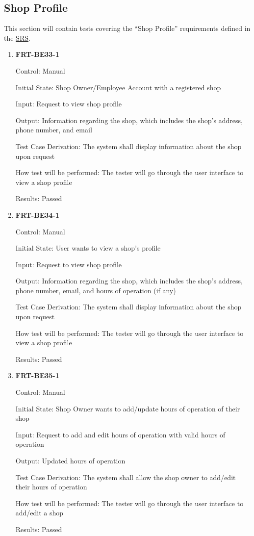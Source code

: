 \documentclass[12pt, titlepage]{article}
\begin{document}
\subsection{Shop Profile}
This section will contain tests covering the ``Shop Profile'' requirements defined in the
\href{https://github.com/arkinmodi/project-sayyara/blob/main/docs/SRS/SRS.pdf}{SRS}.

\begin{enumerate}
	\item \textbf{FRT-BE33-1}

	      Control: Manual

	      Initial State: Shop Owner/Employee Account with a registered shop

	      Input: Request to view shop profile

	      Output: Information regarding the shop, which includes the shop's address, phone number, and email

	      Test Case Derivation: The system shall display information about the shop upon request

	      How test will be performed: The tester will go through the user interface to view a shop profile

	      Results: Passed

	\item \textbf{FRT-BE34-1}

	      Control: Manual

	      Initial State: User wants to view a shop's profile

	      Input: Request to view shop profile

	      Output: Information regarding the shop, which includes the shop's address, phone number, email, and
	      hours of operation (if any)

	      Test Case Derivation: The system shall display information about the shop upon request

	      How test will be performed: The tester will go through the user interface to view a shop profile

	      Results: Passed

	\item \textbf{FRT-BE35-1}

	      Control: Manual

	      Initial State: Shop Owner wants to add/update hours of operation of their shop

	      Input: Request to add and edit hours of operation with valid hours of operation

	      Output: Updated hours of operation

	      Test Case Derivation: The system shall allow the shop owner to add/edit their hours of operation

	      How test will be performed: The tester will go through the user interface to add/edit a shop

	      Results: Passed

\end{enumerate}
\end{document}
